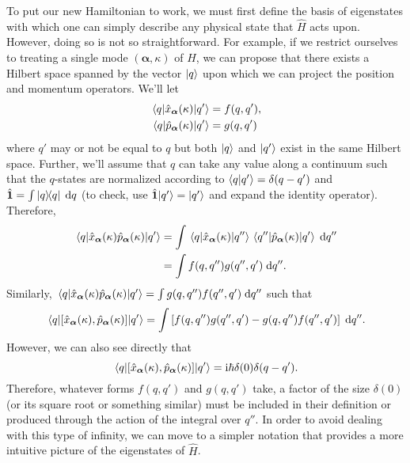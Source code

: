 \documentclass{article}
\numberwithin{equation}{section}
\begin{document}
To put our new Hamiltonian to work, we must first define the basis of eigenstates with which one can simply describe any physical state that $\hat{H}$ acts upon. However, doing so is not so straightforward. For example, if we restrict ourselves to treating a single mode $(\bm{\alpha},\kappa)$ of $\hat{H}$, we can propose that there exists a Hilbert space spanned by the vector $|{q}\rangle$ upon which we can project the position and momentum operators. We'll let
\begin{equation}
\begin{split}
\mel{q}{\hat{x}_{\bm{\alpha}}(\kappa)}{q'} &= f(q,q'),\\
\mel{q}{\hat{p}_{\bm{\alpha}}(\kappa)}{q'} &= g(q,q')
\end{split}
\end{equation}
where $q'$ may or not be equal to $q$ but both $|{q}\rangle$ and $|{q'}\rangle$ exist in the same Hilbert space. Further, we'll assume that $q$ can take any value along a continuum such that the $q$-states are normalized according to $\braket{q}{q'} = \delta(q - q')$ and $\hat{\bm{1}} = \int\dyad{q}{q}\;\mathrm{d}q$ (to check, use $\hat{\bm{1}}|{q'}\rangle = |{q'}\rangle$ and expand the identity operator). Therefore,
\begin{equation}
\begin{split}
\mel{q}{\hat{x}_{\bm{\alpha}}(\kappa)\hat{p}_{\bm{\alpha}}(\kappa)}{q'} &= \int \mel{q}{\hat{x}_{\bm{\alpha}}(\kappa)}{q''}\mel{q''}{\hat{p}_{\bm{\alpha}}(\kappa)}{q'}\;\mathrm{d}q''\\
&= \int f(q,q'')g(q'',q')\;\mathrm{d}q''.
\end{split}
\end{equation}
Similarly, $\mel{q}{\hat{x}_{\bm{\alpha}}(\kappa)\hat{p}_{\bm{\alpha}}(\kappa)}{q'} = \int g(q,q'')f(q'',q')\;\mathrm{d}q''$ such that
\begin{equation}
\mel{q}{\left[\hat{x}_{\bm{\alpha}}(\kappa),\hat{p}_{\bm{\alpha}}(\kappa)\right]}{q'} = \int \left[f(q,q'')g(q'',q') - g(q,q'')f(q'',q')\right]\;\mathrm{d}q''.
\end{equation}
However, we can also see directly that 
\begin{equation}
\mel{q}{\left[\hat{x}_{\bm{\alpha}}(\kappa),\hat{p}_{\bm{\alpha}}(\kappa)\right]}{q'} = \mathrm{i}\hbar\delta(0)\delta(q - q').
\end{equation}
Therefore, whatever forms $f(q,q')$ and $g(q,q')$ take, a factor of the size $\delta(0)$ (or its square root or something similar) must be included in their definition or produced through the action of the integral over $q''$. In order to avoid dealing with this type of infinity, we can move to a simpler notation that provides a more intuitive picture of the eigenstates of $\hat{H}$.
\end{document}
